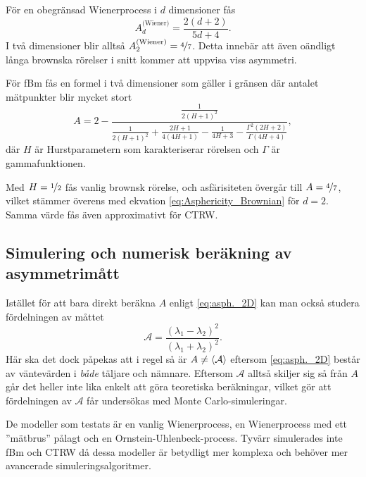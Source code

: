 För en obegränsad Wienerprocess i $d$ dimensioner fås~\cite{Rudnick_Asphericity1986}
\begin{equation} \label{eq:Asphericity_Brownian}
    A_d^\text{(Wiener)}=\frac{2(d+2)}{5d+4}.
\end{equation}
I två dimensioner blir alltså $A_2^\text{(Wiener)}=\nicefrac{4}{7}$. Detta innebär att även oändligt långa brownska rörelser i snitt kommer att uppvisa viss asymmetri.

För fBm fås en formel i två dimensioner som gäller i gränsen där antalet mätpunkter blir mycket stort ~\cite{Hong_asymmetri1998}
\begin{equation} \label{eq:A_fBm}
A=2-
\frac{\frac{1}{2(H+1)^2}}{\frac{1}{2(H+1)^2}+\frac{2H+1}{4(4H+1)}-\frac{1}{4H+3}-\frac{\Gamma^2(2H+2)}{\Gamma(4H+4)}},
\end{equation}
där $H$ är Hurstparametern som karakteriserar rörelsen och $\Gamma$ är gammafunktionen. 

Med $H=\nicefrac{1}{2}$ fås vanlig brownsk rörelse, och asfärisiteten övergår till $A=\nicefrac{4}{7}$, vilket stämmer överens med ekvation \eqref{eq:Asphericity_Brownian} för $d=2$. Samma värde fås även approximativt för CTRW\cite{Ernst_ACTRW2012}.%




 
\subsection{Simulering och numerisk beräkning av asymmetrimått} 
\label{sec:sim_asym}
Istället för att bara direkt beräkna $A$ enligt \eqref{eq:asph._2D} kan man också studera fördelningen av måttet 
\begin{equation}\label{eq:asym}
\mathcal{A} =
\frac{(\lambda_1 - \lambda_2)^2}{(\lambda_1 + \lambda_2)^2}.
\end{equation}
Här ska det dock påpekas att i regel så är $A\neq\ev{\mathcal{A}}$ eftersom \eqref{eq:asph._2D} består av väntevärden i \emph{både} täljare och nämnare. Eftersom $\mathcal{A}$ alltså skiljer sig så från $A$ går det heller inte lika enkelt att göra teoretiska beräkningar, vilket gör att fördelningen av $\mathcal{A}$ får undersökas med Monte Carlo-simuleringar.


De modeller som testats är en vanlig Wienerprocess, en Wienerprocess med ett ''mätbrus'' pålagt och en Ornstein-Uhlenbeck-process. Tyvärr simulerades inte fBm och CTRW då dessa modeller är betydligt mer komplexa och behöver mer avancerade simuleringsalgoritmer. 


